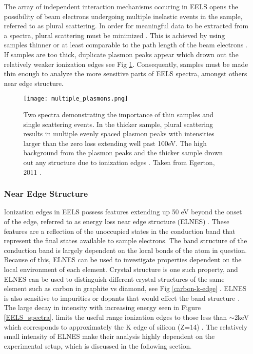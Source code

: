 The array of independent interaction mechanisms occuring in EELS opens the possibility of beam electrons undergoing multiple inelastic events in the sample, referred to as plural scattering.  In order for meaningful data to be extracted from a spectra, plural scattering must be minimized \cite{Egerton}. This is achieved by using samples thinner or at least comparable to the path length of the beam electrons \cite{Egerton}.  If samples are too thick, duplicate plasmon peaks appear which  drown out the relatively weaker ionization edges see Fig \ref{multiple_plasmons}.   Consequently, samples must be made thin enough to analyze the more sensitive parts of EELS spectra, amongst others near edge structure. \\

\begin{figure}
	\centering
	\texttt{[image: multiple\_plasmons.png]}
	\caption{Two spectra demonstrating the importance of thin samples and single scattering events. In the thicker sample, plural scattering results in multiple evenly spaced plasmon peaks with  intensities larger than the zero loss extending well past 100eV.  The high background from the plasmon peaks and the thicker sample drown out any structure due to ionization edges \cite{Egerton}. Taken from Egerton, 2011 \cite{Egerton}.}
	\label{multiple_plasmons}
\end{figure}





\subsubsection{Near Edge Structure}
Ionization edges in EELS possess features extending up 50 eV beyond the onset of the edge, referred to as energy loss near edge structure (ELNES) \cite{Egerton}.   These features are a reflection of the unoccupied states in the conduction band that represent the final states available to sample electrons.  The band structure of the conduction band is largely dependent on the local bonds of the atom in question.  Because of this, ELNES can be used to investigate properties dependent on the local environment of each element.   Crystal structure is one such property, and ELNES can be used to distinguish different crystal structures of the same element such as carbon in graphite vs diamond, see Fig \ref{carbon-k-edge} \cite{hamon_elnes_2004}.  ELNES is also sensitive to impurities or dopants that would effect the band structure \cite{torrisi_atomic_2016}.  The large decay in intensity with increasing energy seen in Figure \ref{EELS_spectra}, limits the useful range ionization edges to those less than $\sim$2keV which corresponds to approximately the K edge of silicon (Z=14) \cite{reimer_transmission_2008}.  The relatively small intensity of ELNES make their analysis highly dependent on the experimental setup, which is discussed in the following section.  \\


